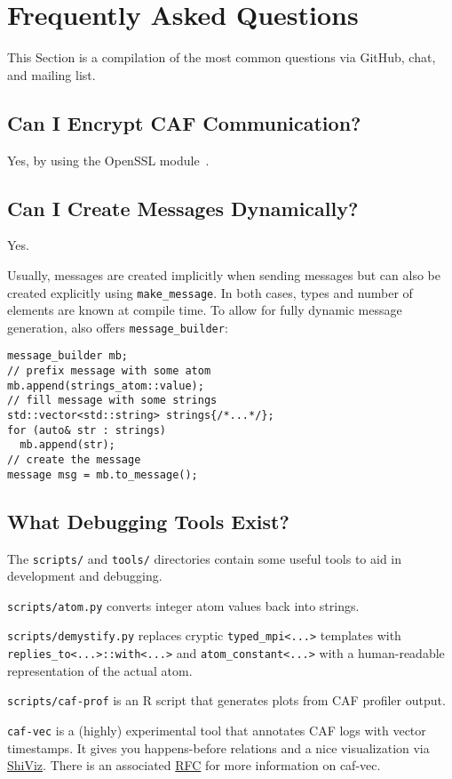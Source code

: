 \section{Frequently Asked Questions}
\label{faq}

This Section is a compilation of the most common questions via GitHub, chat, and mailing list.

\subsection{Can I Encrypt CAF Communication?}

Yes, by using the OpenSSL module~.

\subsection{Can I Create Messages Dynamically?}

Yes.

Usually, messages are created implicitly when sending messages but can also be created explicitly using \lstinline^make_message^.
In both cases, types and number of elements are known at compile time.
To allow for fully dynamic message generation, \lib also offers \lstinline^message_builder^:

\begin{lstlisting}
message_builder mb;
// prefix message with some atom
mb.append(strings_atom::value);
// fill message with some strings
std::vector<std::string> strings{/*...*/};
for (auto& str : strings)
  mb.append(str);
// create the message
message msg = mb.to_message();
\end{lstlisting}

\subsection{What Debugging Tools Exist?}

The \lstinline^scripts/^ and \lstinline^tools/^ directories contain some useful tools to aid in development and debugging.

\lstinline^scripts/atom.py^ converts integer atom values back into strings.

\lstinline^scripts/demystify.py^ replaces cryptic \lstinline^typed_mpi<...>^ templates with \lstinline^replies_to<...>::with<...>^
and \lstinline^atom_constant<...>^ with a human-readable representation of the actual atom.

\lstinline^scripts/caf-prof^ is an R script that generates plots from CAF profiler output.

\lstinline^caf-vec^ is a (highly) experimental tool that annotates CAF logs with vector timestamps. It gives you happens-before
relations and a nice visualization via \href{https://bestchai.bitbucket.io/shiviz/}{ShiViz}. There is an associated
\href{https://github.com/actor-framework/rfcs/blob/master/proposals/0001-minimal-debugging-and-shiviz-support.md}{RFC} for more information on
caf-vec.
